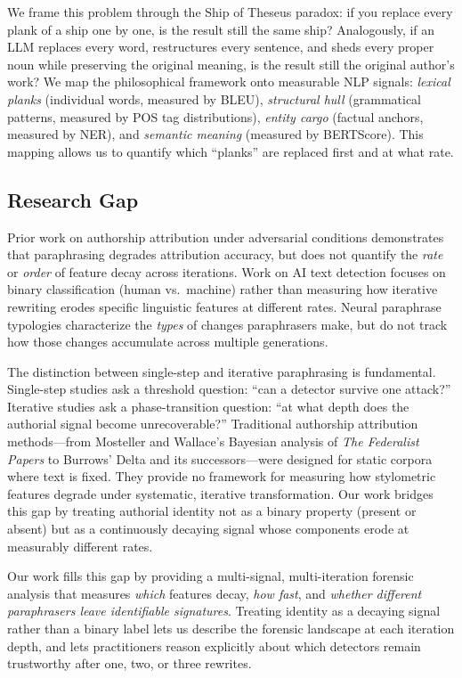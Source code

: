 We frame this problem through the Ship of Theseus paradox: if you replace every plank of a ship one by one, is the result still the same ship? Analogously, if an LLM replaces every word, restructures every sentence, and sheds every proper noun while preserving the original meaning, is the result still the original author's work? We map the philosophical framework onto measurable NLP signals: \emph{lexical planks} (individual words, measured by BLEU), \emph{structural hull} (grammatical patterns, measured by POS tag distributions), \emph{entity cargo} (factual anchors, measured by NER), and \emph{semantic meaning} (measured by BERTScore). This mapping allows us to quantify which ``planks'' are replaced first and at what rate.

\subsection{Research Gap}

Prior work on authorship attribution under adversarial conditions \cite{koppel2011authorship} demonstrates that paraphrasing degrades attribution accuracy, but does not quantify the \emph{rate} or \emph{order} of feature decay across iterations. Work on AI text detection \cite{mitchell2023detectgpt} focuses on binary classification (human vs.\ machine) rather than measuring how iterative rewriting erodes specific linguistic features at different rates. Neural paraphrase typologies \cite{wahle2023paraphrase} characterize the \emph{types} of changes paraphrasers make, but do not track how those changes accumulate across multiple generations.

The distinction between single-step and iterative paraphrasing is fundamental. Single-step studies ask a threshold question: ``can a detector survive one attack?'' Iterative studies ask a phase-transition question: ``at what depth does the authorial signal become unrecoverable?'' Traditional authorship attribution methods---from Mosteller and Wallace's Bayesian analysis of \emph{The Federalist Papers} to Burrows' Delta and its successors---were designed for static corpora where text is fixed. They provide no framework for measuring how stylometric features degrade under systematic, iterative transformation. Our work bridges this gap by treating authorial identity not as a binary property (present or absent) but as a continuously decaying signal whose components erode at measurably different rates.

Our work fills this gap by providing a multi-signal, multi-iteration forensic analysis that measures \emph{which} features decay, \emph{how fast}, and \emph{whether different paraphrasers leave identifiable signatures}. Treating identity as a decaying signal rather than a binary label lets us describe the forensic landscape at each iteration depth, and lets practitioners reason explicitly about which detectors remain trustworthy after one, two, or three rewrites.

